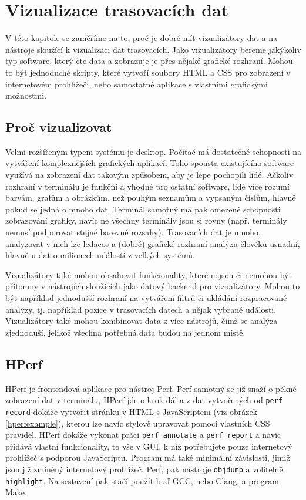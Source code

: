 \chapter{Vizualizace trasovacích dat}
\label{vizualizátory}

V této kapitole se zaměříme na to, proč je dobré mít vizualizátory dat a na nástroje sloužící k vizualizaci dat trasovacích. Jako vizualizátory bereme jakýkoliv typ software, který čte data a zobrazuje je přes nějaké grafické rozhraní. Mohou to být jednoduché skripty, které vytvoří soubory HTML a CSS pro zobrazení v internetovém prohlížeči, nebo samostatné aplikace s vlastními grafickými možnostmi.

\section{Proč vizualizovat}

Velmi rozšířeným typem systému je desktop. Počítač má dostatečné schopnosti na vytváření komplexnějších grafických aplikací. Toho spousta existujícího software využívá na zobrazení dat takovým způsobem, aby je lépe pochopili lidé. Ačkoliv rozhraní v terminálu je funkční a vhodné pro ostatní software, lidé více rozumí barvám, grafům a obrázkům, než pouhým seznamům a vypsaným číslům, hlavně pokud se jedná o mnoho dat. Terminál samotný má pak omezené schopnosti zobrazování grafiky, navíc ne všechny terminály jsou si rovny (např. terminály nemusí podporovat stejné barevné rozsahy). Trasovacích dat je mnoho, analyzovat v nich lze ledacos a (dobré) grafické rozhraní analýzu člověku usnadní, hlavně u dat o milionech událostí z velkých systémů.

Vizualizátory také mohou obsahovat funkcionality, které nejsou či nemohou být přítomny v nástrojích sloužících jako datový backend pro vizualizátory. Mohou to být například jednodušší rozhraní na vytváření filtrů či ukládání rozpracované analýzy, tj. například pozice v trasovacích datech a nějak vybrané události. Vizualizátory také mohou kombinovat data z více nástrojů, čímž se analýza zjednoduší, jelikož všechna potřebná data budou na jednom místě.

\section{HPerf}

HPerf \cite{Hperf-Pages} je frontendová aplikace pro nástroj Perf. Perf samotný se již snaží o pěkné zobrazení dat v terminálu, HPerf jde o krok dál a z dat vytvořených od \texttt{perf record} dokáže vytvořit stránku v HTML s JavaScriptem (viz obrázek \ref{hperfexample}), kterou lze navíc stylově upravovat pomocí vlastních CSS pravidel. HPerf dokáže vykonat práci \texttt{perf annotate} a \texttt{perf report} a navíc přidává vlastní funkcionality, to vše v GUI, k níž potřebujete pouze internetový prohlížeč s podporou JavaScriptu. Program má také minimální závislosti, jimiž jsou již zmíněný internetový prohlížeč, Perf, pak nástroje \texttt{objdump} a volitelně \texttt{highlight}. Na sestavení pak stačí použít buď GCC, nebo Clang, a program Make.

